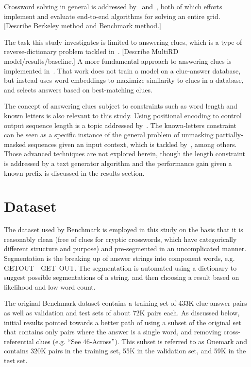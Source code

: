 \documentclass[letterpaper]{article} %
\begin{document}
\begin{NoHyper}
Crossword solving in general is addressed by~\citealp{kulshreshtha2022across} and~\citealp{wallace2022automated}, both of which efforts implement and evaluate end-to-end algorithms for solving an entire grid. [Describe Berkeley method and Benchmark method.]

The task this study investigates is limited to answering clues, which is a type of reverse-dictionary problem tackled in~\citealp{zhang2019multichannel}. [Describe MultiRD model/results/baseline.] A more fundamental approach to answering clues is implemented in~\citealp{baselinesolver}.
That work does not train a model on a clue-answer database, but instead uses word embeddings to maximize similarity to clues in a database, and selects answers based on best-matching clues.

The concept of answering clues subject to constraints such as word length and known letters is also relevant to this study. Using positional encoding to control output sequence length is a topic addressed by~\citealp{takase2019positional}. The known-letters constraint can be seen as a specific instance of the general problem of unmasking partially-masked sequences given an input context, which is tackled by~\citealp{raffel2023exploring}, among others. Those advanced techniques are not explored herein, though the length constraint is addressed by a text generator algorithm and the performance gain given a known prefix is discussed in the results section.


\section{Dataset}
\label{sec:dataset}

The dataset used by Benchmark is employed in this study on the basis that it is reasonably clean (free of clues for cryptic crosswords, which have categorically different structure and purpose) and pre-segmented in an uncomplicated manner. Segmentation is the breaking up of answer strings into component words, e.g. GETOUT~\textrightarrow~GET~OUT. The segmentation is automated using a dictionary to suggest possible segmentations of a string, and then choosing a result based on likelihood and low word count.

The original Benchmark dataset contains a training set of 433K clue-answer pairs as well as validation and test sets of about 72K pairs each. As discussed below, initial results pointed towards a better path of using a subset of the original set that contains only pairs where the answer is a single word, and removing cross-referential clues (e.g. ``See 46-Across''). This subset is referred to as Onemark and contains 320K pairs in the training set, 55K in the  validation set, and 59K in the test set.


\end{NoHyper}
\end{document}
